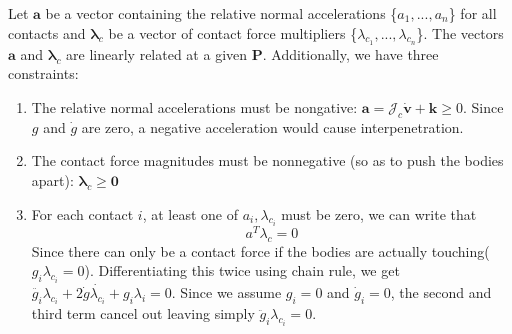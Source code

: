         Let $\pmb{a}$ be a vector containing the relative normal accelerations \{$a_1,...,a_n$\} for all contacts and $\pmb{\lambda}_c$ be a vector of contact force multipliers \{$\lambda_{c_1},..., \lambda_{c_n}$\}. The vectors $\pmb{a}$ and $\pmb{\lambda}_c$ are linearly related at a given $\mathbf{P}$. Additionally, we have three constraints:
        \begin{enumerate}
            \item The relative normal accelerations must be nongative: $\pmb{a} = \mathcal{J}_c\dot{\mathbf{v}}+\pmb{k} \ge 0$. Since $g$ and $\dot{g}$ are zero, a negative acceleration would cause interpenetration.
            \item The contact force magnitudes must be nonnegative (so as to push the bodies apart): $\pmb{\lambda}_c \ge \pmb{0}$
            \item For each contact $i$, at least one of $a_i, \lambda_{c_i}$ must be zero, we can write that
            \begin{equation}
                a^{T}\lambda_{c} = 0
            \end{equation}
            Since there can only be a contact force if the bodies are actually touching($g_i\lambda_{c_i} = 0$). Differentiating this twice using chain rule, we get $\ddot{g_i}\lambda_{c_i} + 2\dot{g}\dot{\lambda_{c_i}} + g_i\lambda_{i} = 0$. Since we assume $g_i = 0$ and $\dot{g}_i = 0$, the second and third term cancel out leaving simply $\ddot{g}_i \lambda_{c_i}=0$.   
        \end{enumerate}

        \subsection{}